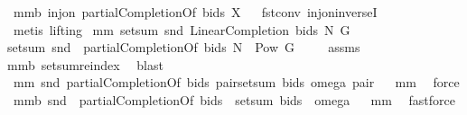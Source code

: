 \begin{isabellebody}
\endisatagproof
{\isafoldproof}%
%
\isadelimproof
%
\endisadelimproof
\isanewline
{}\isamarkupfalse%
\ mm{}{}b{\isacharcolon}\ {\isachardoublequoteopen}inj{\isacharunderscore}on\ {\isacharparenleft}partialCompletionOf\ bids{\isacharparenright}\ X{\isachardoublequoteclose}%
\isadelimproof
\ %
\endisadelimproof
%
\isatagproof
{}\isamarkupfalse%
\ fst{\isacharunderscore}conv\ inj{\isacharunderscore}on{\isacharunderscore}inverseI\ \isamarkupfalse%
\ {\isacharparenleft}metis\ {\isacharparenleft}lifting{\isacharparenright}{\isacharparenright}%
\endisatagproof
{\isafoldproof}%
%
\isadelimproof
%
\endisadelimproof
\isanewline
{}\isamarkupfalse%
\ mm{}{}{\isacharcolon}\ {\isachardoublequoteopen}setsum\ snd\ {\isacharparenleft}LinearCompletion\ bids\ N\ G{\isacharparenright}\ {\isacharequal}\ \isanewline
setsum\ {\isacharparenleft}snd\ {\isasymcirc}\ {\isacharparenleft}partialCompletionOf\ bids{\isacharparenright}{\isacharparenright}\ {\isacharparenleft}N\ {\isasymtimes}\ {\isacharparenleft}Pow\ G\ {\isacharminus}\ {\isacharbraceleft}{\isacharbraceleft}{\isacharbraceright}{\isacharbraceright}{\isacharparenright}{\isacharparenright}{\isachardoublequoteclose}%
\isadelimproof
\ %
\endisadelimproof
%
\isatagproof
{}\isamarkupfalse%
\ assms\ \isanewline
mm{}{}b\ setsum{\isachardot}reindex\ \isamarkupfalse%
\ blast%
\endisatagproof
{\isafoldproof}%
%
\isadelimproof
%
\endisadelimproof
\ \isanewline
{}\isamarkupfalse%
\ mm{}{}{\isacharcolon}\ {\isachardoublequoteopen}snd\ {\isacharparenleft}partialCompletionOf\ bids\ pair{\isacharparenright}{\isacharequal}setsum\ bids\ {\isacharparenleft}omega\ pair{\isacharparenright}{\isachardoublequoteclose}%
\isadelimproof
\ %
\endisadelimproof
%
\isatagproof
{}\isamarkupfalse%
\ mm{}{}\ \isamarkupfalse%
\ force%
\endisatagproof
{\isafoldproof}%
%
\isadelimproof
%
\endisadelimproof
\isanewline
{}\isamarkupfalse%
\ mm{}{}b{\isacharcolon}\ {\isachardoublequoteopen}snd\ {\isasymcirc}\ partialCompletionOf\ bids\ {\isacharequal}\ {\isacharparenleft}setsum\ bids{\isacharparenright}\ {\isasymcirc}\ omega{\isachardoublequoteclose}%
\isadelimproof
\ %
\endisadelimproof
%
\isatagproof
{}\isamarkupfalse%
\ mm{}{}\ \isamarkupfalse%
\ fastforce%
\endisatagproof
{\isafoldproof}%
%
\isadelimproof

\end{isabellebody}
